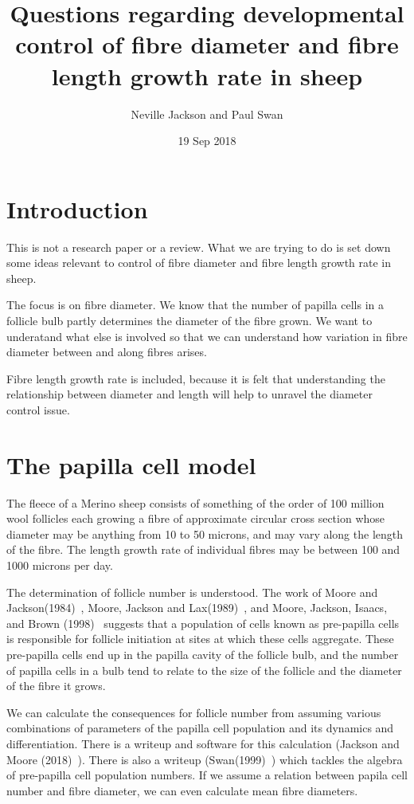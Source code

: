 \documentclass[titlepage]{article}  %
\title{Questions regarding developmental control of fibre diameter and fibre length growth rate in sheep}
\author{Neville Jackson and  Paul Swan}
\date{19 Sep 2018}
\begin{document}
 
 
\maketitle      
\tableofcontents

\clearpage
\section{Introduction} 
This is not a research paper or a review. What we are trying to do is set down some ideas relevant to control of fibre diameter and fibre length growth rate in sheep. 

The focus is on fibre diameter. We know that the number of papilla cells in a follicle bulb partly determines the diameter of the fibre grown. We want to  underatand what else is involved so that we can understand how variation in fibre diameter between and along fibres arises. 

Fibre length growth rate is included, because it is felt that understanding the relationship between diameter and length will help to unravel the diameter control issue. 

\section{The papilla cell model}
The fleece of a Merino sheep consists of something of the order of 100 million wool follicles each growing a fibre of approximate circular cross section whose diameter may be anything from 10 to 50 microns, and may vary along the  length of the fibre. The length growth rate of individual fibres may be between 100 and 1000 microns per day. 

The determination of follicle number is understood. The work of Moore and Jackson(1984)~\cite{moor:84}, Moore, Jackson and Lax(1989)~\cite{moor:89}, and Moore, Jackson, Isaacs, and Brown (1998)~\cite{moor:98} suggests that a population of cells known as pre-papilla cells is responsible for follicle initiation at sites at which these cells aggregate. These pre-papilla cells end up in the papilla cavity of the follicle bulb, and the number of papilla cells in a bulb tend to relate to the size of the follicle and the diameter of the fibre it grows.

We can calculate the consequences for follicle number from assuming various combinations of parameters of the papilla cell population and its dynamics and differentiation. There is a writeup and software for this calculation (Jackson and Moore (2018)~\cite{jack:18}). There is also a writeup (Swan(1999)~\cite{swan:99}) which tackles the algebra of pre-papilla cell population numbers. If we assume a relation between papila cell number and fibre diameter, we can even calculate mean fibre diameters.
\end{document}
